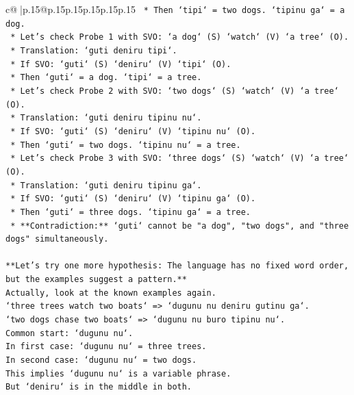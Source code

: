\documentclass{article}
\begin{document}
{\begin{supertabular}{c@{$\;$}|p{.15\linewidth}@{}p{.15\linewidth}p{.15\linewidth}p{.15\linewidth}p{.15\linewidth}p{.15\linewidth}}
{{{\texttt{        *   Then `tipi` = two dogs. `tipinu ga` = a dog.} \\
\texttt{        *   Let's check Probe 1 with SVO: `a dog` (S) `watch` (V) `a tree` (O).} \\
\texttt{        *   Translation: `guti deniru tipi`.} \\
\texttt{        *   If SVO: `guti` (S) `deniru` (V) `tipi` (O).} \\
\texttt{        *   Then `guti` = a dog. `tipi` = a tree.} \\
\texttt{        *   Let's check Probe 2 with SVO: `two dogs` (S) `watch` (V) `a tree` (O).} \\
\texttt{        *   Translation: `guti deniru tipinu nu`.} \\
\texttt{        *   If SVO: `guti` (S) `deniru` (V) `tipinu nu` (O).} \\
\texttt{        *   Then `guti` = two dogs. `tipinu nu` = a tree.} \\
\texttt{        *   Let's check Probe 3 with SVO: `three dogs` (S) `watch` (V) `a tree` (O).} \\
\texttt{        *   Translation: `guti deniru tipinu ga`.} \\
\texttt{        *   If SVO: `guti` (S) `deniru` (V) `tipinu ga` (O).} \\
\texttt{        *   Then `guti` = three dogs. `tipinu ga` = a tree.} \\
\texttt{        *   **Contradiction:** `guti` cannot be "a dog", "two dogs", and "three dogs" simultaneously.} \\
\\ 
\texttt{**Let's try one more hypothesis: The language has no fixed word order, but the examples suggest a pattern.**} \\
\texttt{Actually, look at the known examples again.} \\
\texttt{`three trees watch two boats` => `dugunu nu deniru gutinu ga`.} \\
\texttt{`two dogs chase two boats` => `dugunu nu buro tipinu nu`.} \\
\texttt{Common start: `dugunu nu`.} \\
\texttt{In first case: `dugunu nu` = three trees.} \\
\texttt{In second case: `dugunu nu` = two dogs.} \\
\texttt{This implies `dugunu nu` is a variable phrase.} \\
\texttt{But `deniru` is in the middle in both.} \\
}}}
\end{supertabular}}
\end{document}
